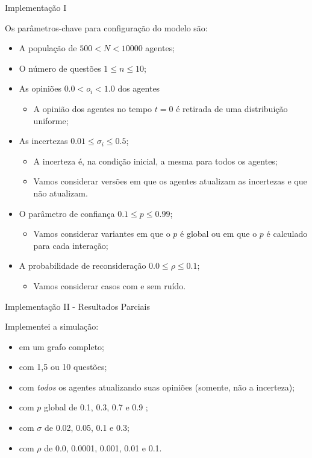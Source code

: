 \documentclass{beamer}
\begin{document}
\begin{frame}{Implementação I}

Os parâmetros-chave para configuração do modelo são:
\begin{itemize}
\item A população de \(500 < N < 10000\) agentes;
\item O número de questões \(1 \leq n \leq 10\); 
\item As opiniões \(0.0< o_i< 1.0\) dos agentes
  \begin{itemize}
  \item A opinião dos agentes no tempo \(t = 0\) é retirada de uma distribuição
    uniforme;
  \end{itemize}
\item As incertezas \(0.01 \leq \sigma_i \leq 0.5\);
  \begin{itemize}
  \item A incerteza é, na condição inicial, a mesma para todos os agentes;
  \item Vamos considerar versões em que os agentes atualizam as incertezas e que
    não atualizam.
  \end{itemize}

\item O parâmetro de confiança \(0.1 \leq p \leq 0.99\);
  \begin{itemize}
  \item Vamos considerar variantes em que o \(p\) é global ou em que o \(p\) é
    calculado para cada interação;
  \end{itemize}
  
\item A probabilidade de reconsideração \(0.0 \leq \rho  \leq 0.1\);
  \begin{itemize}
  \item Vamos considerar casos com e sem ruído.
  \end{itemize}
\end{itemize}
\end{frame}


\begin{frame}{Implementação II - Resultados Parciais}

Implementei a simulação:
\begin{itemize}
\item em um grafo completo;
\item  com 1,5 ou 10 questões;
\item com \textit{todos} os agentes atualizando suas opiniões (somente, não a incerteza);
\item com \(p\) global de 0.1, 0.3, 0.7 e 0.9 ; 
\item com \(\sigma\) de 0.02, 0.05, 0.1 e 0.3;
  \item com \(\rho\) de 0.0, 0.0001, 0.001, 0.01 e 0.1.
\end{itemize}
\end{frame}
\end{document}
